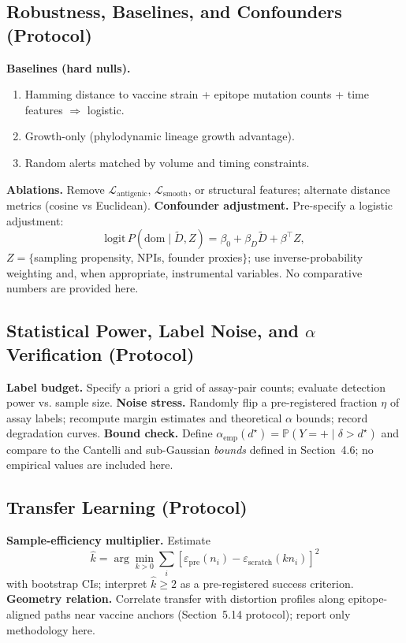 \documentclass[11pt]{article}
\begin{document}
\subsection{Robustness, Baselines, and Confounders (Protocol)}
\label{sec:baselines}
\textbf{Baselines (hard nulls).}
\begin{enumerate}[label=(\alph*), leftmargin=*]
  \item Hamming distance to vaccine strain + epitope mutation counts + time features $\Rightarrow$ logistic.
  \item Growth-only (phylodynamic lineage growth advantage).
  \item Random alerts matched by volume and timing constraints.
\end{enumerate}
\textbf{Ablations.} Remove $\mathcal{L}_{\text{antigenic}}$, $\mathcal{L}_{\text{smooth}}$, or structural features; alternate distance metrics (cosine vs Euclidean).  
\textbf{Confounder adjustment.} Pre-specify a logistic adjustment:
\[
\mathrm{logit}\,P(\text{dom}\mid \tilde D, Z)=\beta_0 + \beta_D \tilde D + \beta^\top Z,
\]
$Z=\{$sampling propensity, NPIs, founder proxies$\}$; use inverse-probability weighting and, when appropriate, instrumental variables. No comparative numbers are provided here.

\subsection{Statistical Power, Label Noise, and $\alpha$ Verification (Protocol)}
\label{sec:power}
\textbf{Label budget.} Specify a priori a grid of assay-pair counts; evaluate detection power vs. sample size.  
\textbf{Noise stress.} Randomly flip a pre-registered fraction $\eta$ of assay labels; recompute margin estimates and theoretical $\alpha$ bounds; record degradation curves.  
\textbf{Bound check.} Define $\alpha_{\text{emp}}(d^\star)=\mathbb{P}(Y{=}+\mid \delta>d^\star)$ and compare to the Cantelli and sub-Gaussian \emph{bounds} defined in Section~4.6; no empirical values are included here.

\subsection{Transfer Learning (Protocol)}
\label{sec:transfer}
\textbf{Sample-efficiency multiplier.}
Estimate 
\[
\widehat{k}=\arg\min_{k>0}\sum_i\!\left[\varepsilon_{\text{pre}}(n_i)-\varepsilon_{\text{scratch}}(k n_i)\right]^2
\]
with bootstrap CIs; interpret $\widehat{k}\ge 2$ as a pre-registered success criterion.  
\textbf{Geometry relation.} Correlate transfer with distortion profiles along epitope-aligned paths near vaccine anchors (Section~5.14 protocol); report only methodology here.
\end{document}
